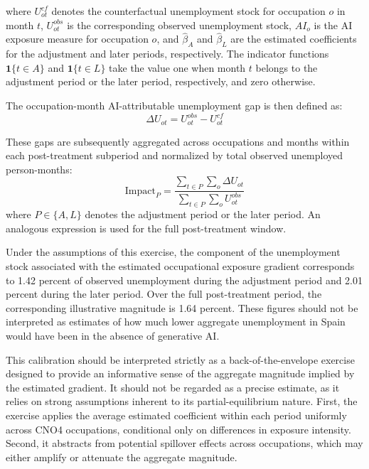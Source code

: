 where $U^{cf}_{ot}$ denotes the counterfactual unemployment stock for occupation $o$ in month $t$, $U^{obs}_{ot}$ is the corresponding observed unemployment stock, $AI_o$ is the AI exposure measure for occupation $o$, and $\hat{\beta}_{A}$ and $\hat{\beta}_{L}$ are the estimated coefficients for the adjustment and later periods, respectively. The indicator functions $\mathbf{1}\{t \in A\}$ and $\mathbf{1}\{t \in L\}$ take the value one when month $t$ belongs to the adjustment period or the later period, respectively, and zero otherwise.

The occupation-month AI-attributable unemployment gap is then defined as:
\begin{equation}
\Delta U_{ot} = U^{obs}_{ot} - U^{cf}_{ot}
\end{equation}

These gaps are subsequently aggregated across occupations and months within each post-treatment subperiod and normalized by total observed unemployed person-months:
\begin{equation}
\text{Impact}_{P}
=
\frac{\sum_{t \in P}\sum_{o}\Delta U_{ot}}
{\sum_{t \in P}\sum_{o}U^{obs}_{ot}}
\end{equation}
where $P \in \{A,L\}$ denotes the adjustment period or the later period. An analogous expression is used for the full post-treatment window.

Under the assumptions of this exercise, the component of the unemployment stock associated with the estimated occupational exposure gradient corresponds to 1.42 percent of observed unemployment during the adjustment period and 2.01 percent during the later period. Over the full post-treatment period, the corresponding illustrative magnitude is 1.64 percent. These figures should not be interpreted as estimates of how much lower aggregate unemployment in Spain would have been in the absence of generative AI.

This calibration should be interpreted strictly as a back-of-the-envelope exercise designed to provide an informative sense of the aggregate magnitude implied by the estimated gradient. It should not be regarded as a precise estimate, as it relies on strong assumptions inherent to its partial-equilibrium nature. First, the exercise applies the average estimated coefficient within each period uniformly across CNO4 occupations, conditional only on differences in exposure intensity. Second, it abstracts from potential spillover effects across occupations, which may either amplify or attenuate the aggregate magnitude.

 
